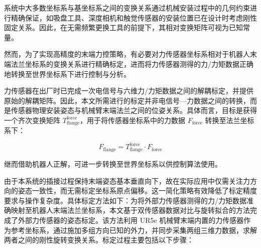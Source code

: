 \documentclass{Diploma}
\begin{document}
系统中大多数坐标系与基坐标系之间的变换关系通过机械安装过程中的几何约束进行精确保证，如吸盘工具、深度相机和触觉传感器的安装位置已在设计时考虑刚性固定关系。因此，在无需频繁更换工具的前提下，其相对变换矩阵可视为已知常量。

然而，为了实现高精度的末端力控策略，有必要对力传感器坐标系相对于机器人末端法兰坐标系的变换关系进行精确标定，进而将力传感器测得的力/力矩数据正确地转换至世界坐标系下进行控制与分析。

力传感器在出厂时已完成一次电信号与六维力/力矩数据之间的解耦标定，并提供原始的解耦矩阵。因此，本文所需进行的标定并非电信号—力数据之间的转换，而是传感器物理安装姿态与机械臂末端法兰之间的位姿关系。具体而言，目标是获得一个齐次变换矩阵 $T_{\text{flange}}^{\text{force}}$，用于将传感器坐标系中的力数据 $F_{\text{force}}$ 转换至法兰坐标系下：

\begin{equation}\label{eq:force}
F_{\text{flange}} = T_{\text{flange}}^{\text{force}} \cdot F_{\text{force}}
\end{equation}

继而借助机器人正解，可进一步转换至世界坐标系以供控制算法使用。

由于本系统的插接过程保持末端姿态基本垂直向下，故在实际应用中仅需关注力方向的姿态一致性，而无需标定坐标系原点偏移。这一简化策略有效降低了标定精度要求与操作复杂度。具体标定方法如下：为将外部力传感器测得的力/力矩数据准确映射至机器人末端法兰坐标系，本文基于双传感器数据对比与旋转拟合的方法完成了外部力传感器的姿态标定。该方法利用 UR5e 机械臂末端内置的力传感器作为参考坐标系，通过施加多组方向已知的外力，并同步采集两组三维力数据，求解两者之间的刚性旋转变换关系。标定过程主要包括以下步骤：
\end{document}
